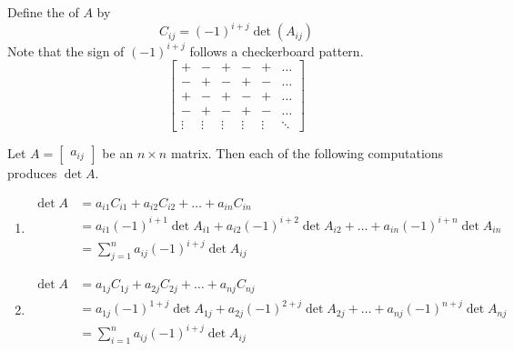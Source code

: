 \documentclass{ximera}
\begin{document}
 Define the  of $A$ by
 $$C_{ij}=(-1)^{i+j}\det(A_{ij})$$
 Note that the sign of $(-1)^{i+j}$ follows a checkerboard pattern.
 $$\begin{bmatrix}+&-&+&-&+&\ldots\\-&+&-&+&-&\ldots\\
 +&-&+&-&+&\ldots\\-&+&-&+&-&\ldots\\\vdots &\vdots  & \vdots & \vdots &\vdots &\ddots \end{bmatrix}$$

\begin{theorem}\label{th:laplace1}
Let $A=\begin{bmatrix}a_{ij}\end{bmatrix}$ be an $n\times n$ matrix.  Then each of the following computations produces $\det{A}$.
\begin{enumerate}
    \item \label{eq:laplace1a} 
\begin{align*}
\det{A}&=a_{i1}C_{i1}+a_{i2}C_{i2}+\ldots +a_{in}C_{in}\\
&=a_{i1}(-1)^{i+1}\det{A_{i1}}+a_{i2}(-1)^{i+2}\det{A_{i2}}+\ldots +a_{in}(-1)^{i+n}\det{A_{in}}\\
&=\sum_{j=1}^na_{ij}(-1)^{i+j}\det{A_{ij}}
\end{align*}
\item \label{eq:laplace1b} 
\begin{align*}
\det{A}&=a_{1j}C_{1j}+a_{2j}C_{2j}+\ldots +a_{nj}C_{nj}\\
&=a_{1j}(-1)^{1+j}\det{A_{1j}}+a_{2j}(-1)^{2+j}\det{A_{2j}}+\ldots +a_{nj}(-1)^{n+j}\det{A_{nj}}\\
&=\sum_{i=1}^na_{ij}(-1)^{i+j}\det{A_{ij}}
\end{align*}
\end{enumerate}
\end{theorem}
 
 
\end{document}

